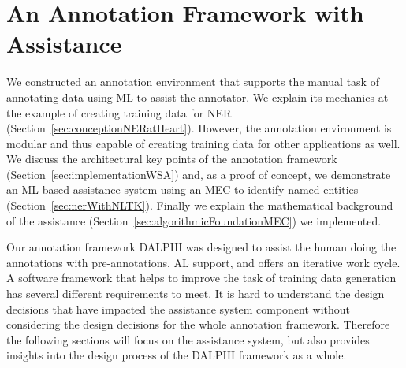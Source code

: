 \section{An Annotation Framework with Assistance}
	We constructed an annotation environment that supports the manual task of annotating data using \ac{ML} to assist the annotator. We explain its mechanics at the example of creating training data for \ac{NER} (Section~\ref{sec:conceptionNERatHeart}). However, the annotation environment is modular and thus capable of creating training data for other applications as well. We discuss the architectural key points of the annotation framework (Section~\ref{sec:implementationWSA}) and, as a proof of concept, we demonstrate an \ac{ML} based assistance system using an \ac{MEC} to identify named entities (Section~\ref{sec:nerWithNLTK}). Finally we explain the mathematical background of the assistance (Section~\ref{sec:algorithmicFoundationMEC}) we implemented.

	Our annotation framework \ac{DALPHI} was designed to assist the human doing the annotations with pre-annotations, \ac{AL} support, and offers an iterative work cycle.	A software framework that helps to improve the task of training data generation has several different requirements to meet.	It is hard to understand the design decisions that have impacted the assistance system component without considering the design decisions for the whole annotation framework. Therefore the following sections will focus on the assistance system, but also provides insights into the design process of the \ac{DALPHI} framework as a whole.

	
	
